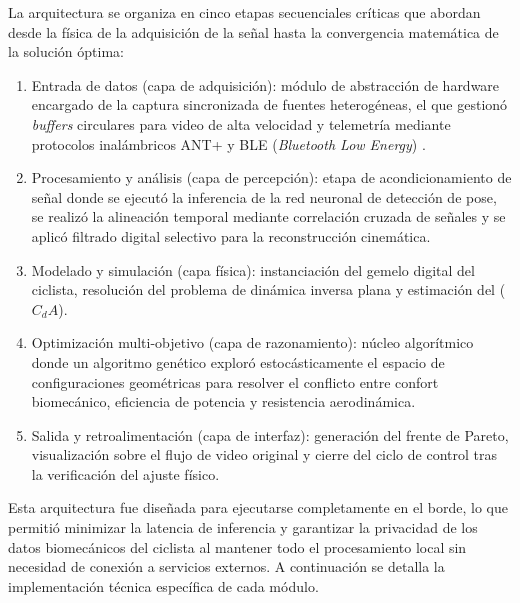 La arquitectura se organiza en cinco etapas secuenciales críticas que abordan
desde la física de la adquisición de la señal hasta la convergencia matemática
de la solución óptima:

\begin{enumerate}
  \item Entrada de datos (capa de adquisición): módulo de abstracción de hardware
        encargado de la captura sincronizada de fuentes heterogéneas, el que gestionó
        \textit{buffers} circulares para video de alta velocidad y telemetría mediante
        protocolos inalámbricos ANT+ \citep{ANTPlus} y BLE (\textit{Bluetooth Low
          Energy}) \citep{Gomez2012BLE}.
  \item Procesamiento y análisis (capa de percepción): etapa de acondicionamiento de
        señal donde se ejecutó la inferencia de la red neuronal de detección de pose,
        se realizó la alineación temporal mediante correlación cruzada de señales y se
        aplicó filtrado digital selectivo para la reconstrucción cinemática.
  \item Modelado y simulación (capa física): instanciación del gemelo digital del
        ciclista, resolución del problema de dinámica inversa plana y estimación del
        ($C_d A$).
  \item Optimización multi-objetivo (capa de razonamiento): núcleo algorítmico donde un
        algoritmo genético exploró estocásticamente el espacio de configuraciones
        geométricas para resolver el conflicto entre confort biomecánico, eficiencia de
        potencia y resistencia aerodinámica.
  \item Salida y retroalimentación (capa de interfaz): generación del frente de Pareto,
        visualización sobre el flujo de video original y cierre del ciclo de control
        tras la verificación del ajuste físico.
\end{enumerate}

Esta arquitectura fue diseñada para ejecutarse completamente en el borde, lo
que permitió minimizar la latencia de inferencia y garantizar la privacidad de
los datos biomecánicos del ciclista al mantener todo el procesamiento local sin
necesidad de conexión a servicios externos. A continuación se detalla la
implementación técnica específica de cada módulo.

